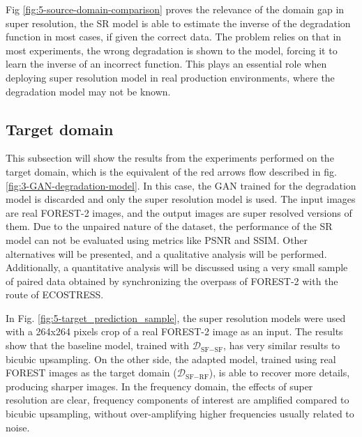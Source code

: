         Fig \ref{fig:5-source-domain-comparison} proves the relevance of the domain gap in super resolution, the SR model is able to estimate the inverse of the degradation function in most cases, if given the correct data.
        The problem relies on that in most experiments, the wrong degradation is shown to the model, forcing it to learn the inverse of an incorrect function.  
        This plays an essential role when deploying super resolution model in real production environments, where the degradation model may not be known. 

    \subsection{Target domain}

        This subsection will show the results from the experiments performed on the target domain, which is the equivalent of the red arrows flow described in fig. \ref{fig:3-GAN-degradation-model}.
        In this case, the GAN trained for the degradation model is discarded and only the super resolution model is used.
        The input images are real FOREST-2 images, and the output images are super resolved versions of them. 
        Due to the unpaired nature of the dataset, the performance of the SR model can not be evaluated using metrics like PSNR and SSIM. 
        Other alternatives will be presented, and a qualitative analysis will be performed. 
        Additionally, a quantitative analysis will be discussed using a very small sample of paired data obtained by synchronizing the overpass of FOREST-2 with the route of ECOSTRESS.


        In Fig. \ref{fig:5-target_prediction_sample}, the super resolution models were used with a 264x264 pixels crop of a real FOREST-2 image as an input.
        The results show that the baseline model, trained with $\mathcal{D}_{\text{SF}-\text{SF}}$, has very similar results to bicubic upsampling.
        On the other side, the adapted model, trained using real FOREST images as the target domain ($\mathcal{D}_{\text{SF}-\text{RF}}$), is able to recover more details, producing sharper images.
        In the frequency domain, the effects of super resolution are clear, frequency components of interest are amplified compared to bicubic upsampling, without over-amplifying higher frequencies usually related to noise.
        
        


